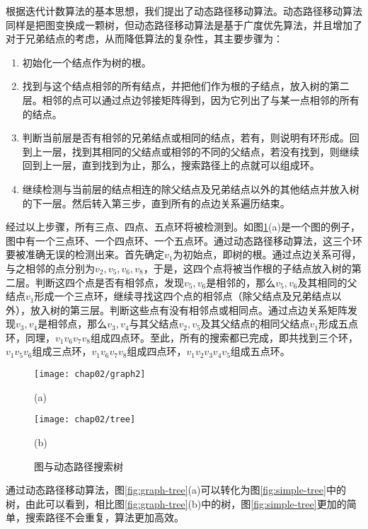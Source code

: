根据迭代计数算法的基本思想，我们提出了动态路径移动算法。动态路径移动算法同样是把图变换成一颗树，但动态路径移动算法是基于广度优先算法，并且增加了对于兄弟结点的考虑，从而降低算法的复杂性，其主要步骤为：
\begin{enumerate}
\item 初始化一个结点作为树的根。
\item 找到与这个结点相邻的所有结点，并把他们作为根的子结点，放入树的第二层。相邻的点可以通过点边邻接矩阵得到，因为它列出了与某一点相邻的所有的结点。
\item 判断当前层是否有相邻的兄弟结点或相同的结点，若有，则说明有环形成。回到上一层，找到其相同的父结点或相邻的不同的父结点，若没有找到，则继续回到上一层，直到找到为止，那么，搜索路径上的点就可以组成环。
\item 继续检测与当前层的结点相连的除父结点及兄弟结点以外的其他结点并放入树的下一层。然后转入第三步，直到所有的点边关系遍历结束。
\end{enumerate}
经过以上步骤，所有三点、四点、五点环将被检测到。如图\ref{fig:cycle-tree}(a)是一个图的例子，图中有一个三点环、一个四点环、一个五点环。通过动态路径移动算法，这三个环要被准确无误的检测出来。首先确定$v_1$为初始点，即树的根。通过点边关系可得，与之相邻的点分别为$v_2, v_5, v_6, v_8$，于是，这四个点将被当作根的子结点放入树的第二层。判断这四个点是否有相邻点，发现$v_5, v_6$是相邻的，那么$v_5, v_6$及其相同的父结点$v_1$形成一个三点环，继续寻找这四个点的相邻点（除父结点及兄弟结点以外），放入树的第三层。判断这些点有没有相邻点或相同点。通过点边关系矩阵发现$v_3,v_4$是相邻点，那么$v_3,v_4$与其父结点$v_2,v_5$及其父结点的相同父结点$v_1$形成五点环，同理，$v_{1}v_{6}v_{7}v_{8}$组成四点环。至此，所有的搜索都已完成，即共找到三个环，$v_{1}v_{5}v_{6}$组成三点环，$v_{1}v_{6}v_{7}v_{8}$组成四点环，$v_{1}v_{2}v_{3}v_{4}v_{5}$组成五点环。

\begin{figure}
\centering
  \begin{minipage}[b]{1\textwidth} 
      \centering 
       \texttt{[image: chap02/graph2]}
       \centerline{(a)}\medskip
    \end{minipage}
  \begin{minipage}[b]{1\textwidth}
    \centering
    \texttt{[image: chap02/tree]}
    \centerline{(b)}\medskip
  \end{minipage}
\caption{图与动态路径搜索树}
\label{fig:cycle-tree}
\end{figure}

通过动态路径移动算法，图\ref{fig:graph-tree}(a)可以转化为图\ref{fig:simple-tree}中的树，由此可以看到，相比图\ref{fig:graph-tree}(b)中的树，图\ref{fig:simple-tree}更加的简单，搜索路径不会重复，算法更加高效。

